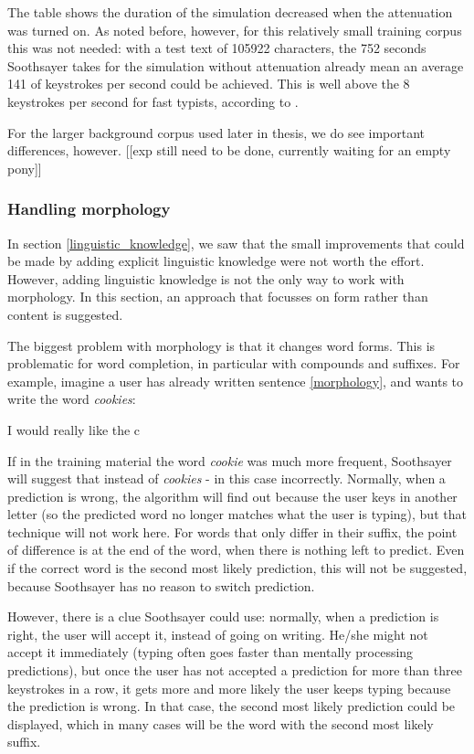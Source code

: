 \documentclass[12pt]{article}
\begin{document}
The table shows the duration of the simulation decreased when the attenuation was turned on. As noted before, however, for this relatively small training corpus this was not needed: with a test text of 105922 characters, the 752 seconds Soothsayer takes for the simulation without attenuation already mean an average 141 of keystrokes per second could be achieved. This is well above the 8 keystrokes per second for fast typists, according to .

For the larger background corpus used later in thesis, we do see important differences, however. [[exp still need to be done, currently waiting for an empty pony]]


\subsubsection{Handling morphology} \label{early}
In section \ref{linguistic_knowledge}, we saw that the small improvements that could be made by adding explicit linguistic knowledge were not worth the effort. However, adding linguistic knowledge is not the only way to work with morphology. In this section, an approach that focusses on form rather than content is suggested.

The biggest problem with morphology is that it changes word forms. This is problematic for word completion, in particular with compounds and suffixes. For example, imagine a user has already written sentence \ref{morphology}, and wants to write the word \emph{cookies}:

\begin{examples}
\item I would really like the c \label{morphology}
\end{examples}

If in the training material the word \emph{cookie} was much more frequent, Soothsayer will suggest that instead of \emph{cookies} - in this case incorrectly. Normally, when a prediction is wrong, the algorithm will find out because the user keys in another letter (so the predicted word no longer matches what the user is typing), but that technique will not work here. For words that only differ in their suffix, the point of difference is at the end of the word, when there is nothing left to predict. Even if the correct word is the second most likely prediction, this will not be suggested, because Soothsayer has no reason to switch prediction.

However, there is a clue Soothsayer could use: normally, when a prediction is right, the user will accept it, instead of going on writing. He/she might not accept it immediately (typing often goes faster than mentally processing predictions), but once the user has not accepted a prediction for more than three keystrokes in a row, it gets more and more likely the user keeps typing because the prediction is wrong. In that case, the second most likely prediction could be displayed, which in many cases will be the word with the second most likely suffix.
\end{document}

